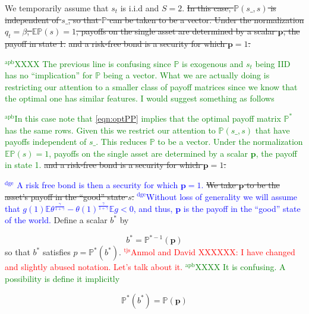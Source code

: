 \documentclass[12pt]{article}
\newcommand{\dge}[1]{\textcolor{blue}{$^{\textrm{dge}}${#1}}}
\newcommand{\apb}[1]{\textcolor{green}{$^{\textrm{apb}}${#1}}}
\newcommand{\tjs}[1]{\textcolor{red}{$^{\textrm{tjs}}${#1}}}
\newcommand{\EE}{\mathbb E}
\begin{document}
We temporarily assume that $s_t$ is i.i.d and  $S=2$.
\st{In this case, $\mathbb{P}(s\_,s)$ is independent of $s\_$, so that $\mathbb{P}$ can be taken to be  a vector.
 Under the normalization  $q_t = \beta$,  $\mathbb{E}\mathbb{P}(s)=1$, payoffs on the single asset are  determined by a  scalar $\bm{p}$, the payoff in state 1.}
 \st{and a risk-free bond is a security for which $\bm{p}=1$.}
 
 \apb{XXXX The previous line is confusing since $\mathbb{P}$ is exogenous and $s_t$ being IID has no ``implication'' for $\mathbb{P}$ being a vector. What we are actually doing is restricting our attention to a smaller class of payoff matrices since we know that the optimal one has similar features. I would suggest something as follows}
 
 \apb{In this case note that \eqref{eqn:optPP} implies that the optimal payoff matrix $\mathbb{P}^*$ has the same rows. Given this we restrict our attention to $\mathbb{P}(s\_,s)$ that have payoffs independent of $s\_$. This reduces $\mathbb{P}$ to be  a vector.
 Under the normalization  $\mathbb{E}\mathbb{P}(s)=1$, payoffs on the single asset are  determined by a  scalar $\bm{p}$, the payoff in state 1.}
 \st{and a risk-free bond is a security for which $\bm{p}=1$.}
 
 
 
 \dge{  A risk free bond is then a security for which $\bm{p} = 1$.}  
\st{We take $\bm{p}$ to be the asset's payoff in the ``good'' state $s$.}  \dge{Without loss of generality we will assume that $ g(1)\EE\theta^\frac{\gamma}{1+\gamma}-\theta(1)^\frac\gamma{1+\gamma} \mathbb{E}g <0$, and thus, $\bm p$ is the payoff in the ``good'' state of the world.}
Define a scalar $b^*$ by %


\begin{equation}
\label{eq-ss}
 b^* =  {\mathbb P}^{* -1}(\bm{p})
\end{equation}
so that $b^*$ satisfies $p={\mathbb P}^*(b^*)$.
\tjs{Anmol and David XXXXXX: I have changed and slightly abused notation. Let's talk about it.}
\apb{XXXX It is confusing. A possibility is define it implicitly }


\begin{equation}
\label{eq-ss}
 \mathbb{P}^*(b^*) =  {\mathbb P}(\bm{p})
\end{equation}
\end{document}
